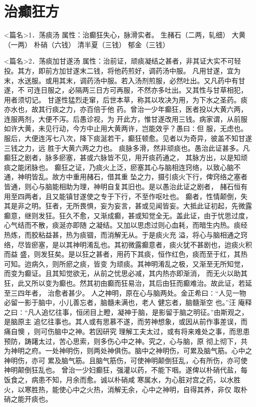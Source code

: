 \documentclass[a4paper,12pt,UTF8,twoside]{ctexbook}
\begin{document}
\chapter{治癫狂方}
<篇名>1．荡痰汤
属性：治癫狂失心，脉滑实者。 
生赭石（二两，轧细） 大黄（一两） 朴硝（六钱） 清半夏（三钱） 郁金（三钱） 


<篇名>2．荡痰加甘遂汤
属性：治前证，顽痰凝结之甚者，非其证大实不可轻投。其方，即前方加甘遂末二钱，将他药煎好，调药汤中服。 
凡用甘遂，宜为末，水送服。或用其末，调药汤中服。若入汤剂煎服，必然吐出。又凡药中有甘遂，不 
可连日服之，必隔两三日方可再服，不然亦多吐出。又其性与甘草相犯，用者须切记。 
甘遂性猛烈走窜，后世本草，称其以攻决为用，为下水之圣药。痰亦水也，故其行痰之力，亦百倍于他 
药。曾治一少年癫狂，医者投以大黄六两，连服两剂，大便不泻。后愚诊视，为 
开此方，惟甘遂改用三钱。病家谓，从前服如许大黄，未见行动，今方中止用大黄两许，岂能效乎？愚曰∶但 
服，无虑也。服后，大便连泻七八次，降下痰涎若干，癫狂顿愈。见者以为奇异，彼盖不知甘遂三钱之力，远 
胜于大黄六两之力也。 
痰脉多滑，然非顽痰也。愚治此证甚多。凡癫狂之剧者，脉多瘀塞，甚或六脉皆不见，用开痰药通之， 
其脉方出，以是知顽痰之能闭脉也。 
癫狂之证，乃痰火上泛，瘀塞其心与脑相连窍络，以致心脑不通，神明皆乱。故方中重用赭石，借其重 
坠之力，摄引痰火下行，俾窍络之塞者皆通，则心与脑能相助为理，神明自复其旧也。是以愚治此证之剧者， 
赭石恒有用至四两者，且又能镇甘遂使之专于下行，不至作呕吐也。 
癫者，性情颠倒，失其是非之明。狂者，无所畏惧，妄为妄言，甚或见闻皆妄。大抵此证初起，先微露 
癫意，继则发狂。狂久不愈，又渐成癫，甚或知觉全无。盖此证，由于忧思过度，心气结而不散，痰涎亦即随 
之凝结。又加以思虑过则心血耗，而暗生内热。痰经热炼，而胶粘益甚，热为痰锢，而消解无从。于是痰火充 
溢，将心与脑相通之窍络，尽皆瘀塞，是以其神明淆乱也。其初微露癫意者，痰火犹不甚剧也，迨痰火积而益 
盛，则发狂矣。是以狂之甚者，用药下其痰，恒作红色，痰而至于红，其热可知。迨病久，则所瘀之痰，皆变 
为顽痰。其神明淆乱之极，又渐至无所知觉，而变为癫证。且其知觉欲无，从前之忧思必减，其内热亦即渐消， 
而无火以助其狂，此又所以变为癫也。然其初由癫而狂易治，其后由狂而癫难治。故此证，若延至三四年者， 
治愈者甚少。 
人之神明，原在心与脑两处。金正希曰∶“人见一物必留一影于脑中，小儿善忘者，脑髓未满也，老人 
健忘者，脑髓渐空 
也。”汪 庵释之曰∶“凡人追忆往事，恒闭目上瞪，凝神于脑，是影留于脑之明征。”由斯观之，是脑原主 
追忆往事也。其人或有思慕不遂，而劳神想象，或因从前作事差误，而痛自懊 ，则可伤脑中之神。若因研究 
理解工夫太过，或有将来难处之事，而思患预防，踌躇太过，苦心思索，则多伤心中之神。究之，心与脑，原 
彻上彻下，共为神明之府。一处神明伤，则两处神俱伤。脑中之神明伤，可累及脑气筋。心中之神明伤，亦可 
累及脑气筋。且脑气筋伤，可使神明颠倒狂乱，心有所伤，亦可使神明颠倒狂乱也。 
曾治一少妇癫狂，强灌以药，不能下咽。遂俾以朴硝代盐，每饭食之，病患不知，月余而愈。诚以朴硝咸 
寒属水，为心脏对宫之药，以水胜火，以寒胜热，能使心中之火热，消解无余，心中之神明，自得其养，非仅 
取朴硝之能开痰也。 
\end{document}
